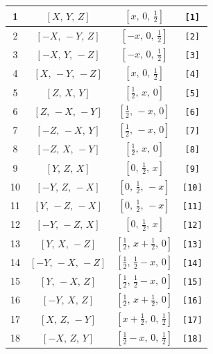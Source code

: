 \documentclass[fleqn,8pt]{jsarticle}
\begin{document}
\begin{longtable}{cccc}
1 & $\left[ X,\, Y,\, Z \right]$ & $\left[ x,\, 0,\, \frac{1}{2} \right]$ & {\tt [1]} \\ \hline
2 & $\left[ - X,\, - Y,\, Z \right]$ & $\left[ - x,\, 0,\, \frac{1}{2} \right]$ & {\tt [2]} \\ \hline
3 & $\left[ - X,\, Y,\, - Z \right]$ & $\left[ - x,\, 0,\, \frac{1}{2} \right]$ & {\tt [3]} \\ \hline
4 & $\left[ X,\, - Y,\, - Z \right]$ & $\left[ x,\, 0,\, \frac{1}{2} \right]$ & {\tt [4]} \\ \hline
5 & $\left[ Z,\, X,\, Y \right]$ & $\left[ \frac{1}{2},\, x,\, 0 \right]$ & {\tt [5]} \\ \hline
6 & $\left[ Z,\, - X,\, - Y \right]$ & $\left[ \frac{1}{2},\, - x,\, 0 \right]$ & {\tt [6]} \\ \hline
7 & $\left[ - Z,\, - X,\, Y \right]$ & $\left[ \frac{1}{2},\, - x,\, 0 \right]$ & {\tt [7]} \\ \hline
8 & $\left[ - Z,\, X,\, - Y \right]$ & $\left[ \frac{1}{2},\, x,\, 0 \right]$ & {\tt [8]} \\ \hline
9 & $\left[ Y,\, Z,\, X \right]$ & $\left[ 0,\, \frac{1}{2},\, x \right]$ & {\tt [9]} \\ \hline
10 & $\left[ - Y,\, Z,\, - X \right]$ & $\left[ 0,\, \frac{1}{2},\, - x \right]$ & {\tt [10]} \\ \hline
11 & $\left[ Y,\, - Z,\, - X \right]$ & $\left[ 0,\, \frac{1}{2},\, - x \right]$ & {\tt [11]} \\ \hline
12 & $\left[ - Y,\, - Z,\, X \right]$ & $\left[ 0,\, \frac{1}{2},\, x \right]$ & {\tt [12]} \\ \hline
13 & $\left[ Y,\, X,\, - Z \right]$ & $\left[ \frac{1}{2},\, x + \frac{1}{2},\, 0 \right]$ & {\tt [13]} \\ \hline
14 & $\left[ - Y,\, - X,\, - Z \right]$ & $\left[ \frac{1}{2},\, \frac{1}{2} - x,\, 0 \right]$ & {\tt [14]} \\ \hline
15 & $\left[ Y,\, - X,\, Z \right]$ & $\left[ \frac{1}{2},\, \frac{1}{2} - x,\, 0 \right]$ & {\tt [15]} \\ \hline
16 & $\left[ - Y,\, X,\, Z \right]$ & $\left[ \frac{1}{2},\, x + \frac{1}{2},\, 0 \right]$ & {\tt [16]} \\ \hline
17 & $\left[ X,\, Z,\, - Y \right]$ & $\left[ x + \frac{1}{2},\, 0,\, \frac{1}{2} \right]$ & {\tt [17]} \\ \hline
18 & $\left[ - X,\, Z,\, Y \right]$ & $\left[ \frac{1}{2} - x,\, 0,\, \frac{1}{2} \right]$ & {\tt [18]} \\ \hline

\end{longtable}
\end{document}
